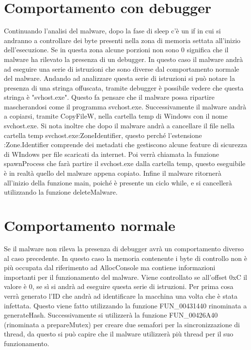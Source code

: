 \documentclass[]{article}
\begin{document}
\section{Comportamento con debugger}
Continuando l'analisi del malware, dopo la fase di sleep c'è un if in cui si andranno a controllare dei byte presenti nella zona di memoria settata all'inizio dell'esecuzione. Se in questa zona alcune porzioni non sono 0 significa che il malware ha rilevato la presenza di un debugger. In questo caso il malware andrà ad eseguire una serie di istruzioni che sono diverse dal comportamento normale del malware. Andando ad analizzare questa serie di istruzioni si può notare la presenza di una stringa offuscata, tramite debugger è possibile vedere che questa stringa è "svhost.exe". Questo fa pensare che il malware possa ripartire mascherandosi come il programma svchost.exe. 
Successivamente il malware andrà a copiarsi, tramite CopyFileW, nella cartella temp di Windows con il nome svchost.exe.
Si nota inoltre che dopo il malware andrà a cancellare il file nella cartella temp svchost.exe:ZoneIdentifier, questo perché l'estensione :Zone.Identifier comprende dei metadati che gestiscono alcune feature di sicurezza di WIndows per file scaricati da internet. 
Poi verrà chiamata la funzione spawnProcess che farà partire il svchost.exe dalla cartella temp, questo eseguibile è in realtà quello del malware appena copiato.  Infine il malware ritornerà all'inizio della funzione main, poiché è presente un ciclo while, e si cancellerà utilizzando la funzione deleteMalware.

\section{Comportamento normale}
Se il malware non rileva la presenza di debugger avrà un comportamento diverso al caso precedente. In questo caso la memoria contenente i byte di controllo non è più occupata dal riferimento ad AllocConsole ma contiene informazioni importanti per il funzionamento del malware. Viene controllato se all'offset 0xC il valore è 0, se sì si andrà ad eseguire questa serie di istruzioni. 
Per prima cosa verrà generato l'ID che andrà ad identificare la macchina una volta che è stata infettata. Questo viene fatto utilizzando la funzione FUN\_00431440 rinominata a generateHash. Successivamente si utilizzerà la funzione FUN\_00426A40 (rinominata a prepareMutex) per creare due semafori per la sincronizzazione di thread, da questo si può capire che il malware utilizzerà più thread per il suo funzionamento. 
\end{document}
